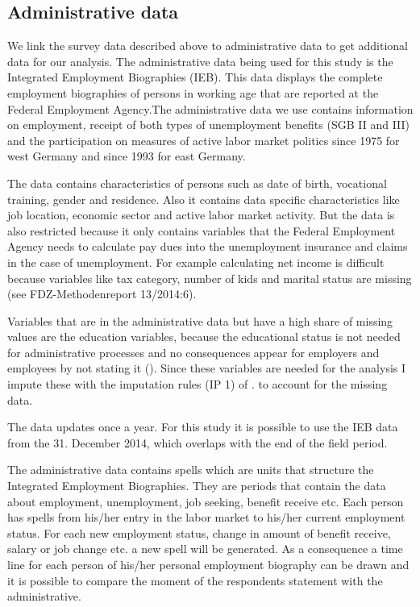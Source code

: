 \subsection{Administrative data}\label{admin}

We link the survey data described above to administrative data to get additional data for our analysis. The administrative data being used for this study is the Integrated Employment Biographies (IEB). This data displays the complete employment biographies of persons in working age that are reported at the Federal Employment Agency.The administrative data we use contains information on employment, receipt of both types of unemployment benefits (SGB II and III) and the participation on measures of active labor market politics since 1975 for west Germany and since 1993 for east Germany.

The data contains characteristics of persons such as date of birth, vocational training, gender and residence. Also it contains data specific characteristics like job location, economic sector and active labor market activity. But the data is also restricted because it only contains variables that the Federal Employment Agency needs to calculate pay dues into the unemployment insurance and claims in the case of unemployment. For example calculating net income is difficult because variables like tax category, number of kids and marital status are missing (see FDZ-Methodenreport 13/2014:6).

Variables that are in the administrative data but have a high share of missing values are the education variables, because the educational status is not needed for administrative processes and no consequences appear for employers and employees by not stating it (\cite{Fitzenbergeretal05}). Since these variables are needed for the analysis I impute these with the imputation rules (IP 1) of \cite{Fitzenbergeretal05}. to account for the missing data.

The data updates once a year. For this study it is possible to use the IEB data from the 31. December 2014, which overlaps with the end of the field period.

The administrative data contains spells which are units that structure the Integrated Employment Biographies. They are periods that contain the data about employment, unemployment, job seeking, benefit receive etc. Each person has spells from his/her entry in the labor market to his/her current employment status. For each new employment status, change in amount of benefit receive, salary or job change etc. a new spell will be generated. As a consequence a time line for each person of his/her personal employment biography can be drawn and it is possible to compare the moment of the respondents statement with the administrative.

